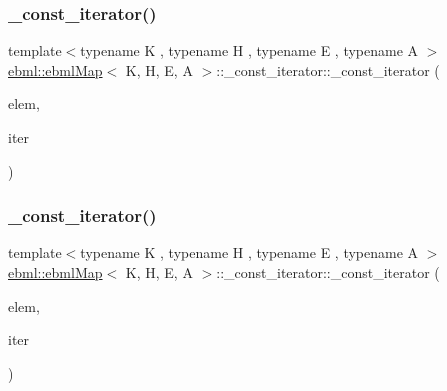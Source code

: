 \subsubsection{\texorpdfstring{\+\_\+const\+\_\+iterator()}{\_const\_iterator()}\hspace{0.1cm}{\footnotesize\ttfamily [1/3]}}
{\footnotesize\ttfamily template$<$typename K , typename H , typename E , typename A $>$ \\
\mbox{\hyperlink{classebml_1_1ebmlMap}{ebml\+::ebml\+Map}}$<$ K, H, E, A $>$\+::\+\_\+const\+\_\+iterator\+::\+\_\+const\+\_\+iterator (\begin{DoxyParamCaption}\item[{const \mbox{\hyperlink{namespaceebml_a2deef4e8071531b32e3533f1bf978917}{c\+\_\+ebml\+Element\+\_\+sp}} \&}]{elem,  }\item[{const typename std\+::unordered\+\_\+map$<$ K, \mbox{\hyperlink{namespaceebml_adad533b7705a16bb360fe56380c5e7be}{ebml\+Element\+\_\+sp}}, H, E, A $>$\+::\mbox{\hyperlink{classebml_1_1ebmlMasterElement_1_1const__iterator}{const\+\_\+iterator}} \&}]{iter }\end{DoxyParamCaption})\hspace{0.3cm}{\ttfamily [protected]}}

\mbox{\label{classebml_1_1ebmlMap_1_1__const__iterator_a3e9d0048a1ec76406c6961f4d180bfbb}} 
\subsubsection{\texorpdfstring{\+\_\+const\+\_\+iterator()}{\_const\_iterator()}\hspace{0.1cm}{\footnotesize\ttfamily [2/3]}}
{\footnotesize\ttfamily template$<$typename K , typename H , typename E , typename A $>$ \\
\mbox{\hyperlink{classebml_1_1ebmlMap}{ebml\+::ebml\+Map}}$<$ K, H, E, A $>$\+::\+\_\+const\+\_\+iterator\+::\+\_\+const\+\_\+iterator (\begin{DoxyParamCaption}\item[{\mbox{\hyperlink{namespaceebml_a2deef4e8071531b32e3533f1bf978917}{c\+\_\+ebml\+Element\+\_\+sp}} \&\&}]{elem,  }\item[{typename std\+::unordered\+\_\+map$<$ K, \mbox{\hyperlink{namespaceebml_adad533b7705a16bb360fe56380c5e7be}{ebml\+Element\+\_\+sp}}, H, E, A $>$\+::\mbox{\hyperlink{classebml_1_1ebmlMasterElement_1_1const__iterator}{const\+\_\+iterator}} \&\&}]{iter }\end{DoxyParamCaption})\hspace{0.3cm}{\ttfamily [protected]}}

